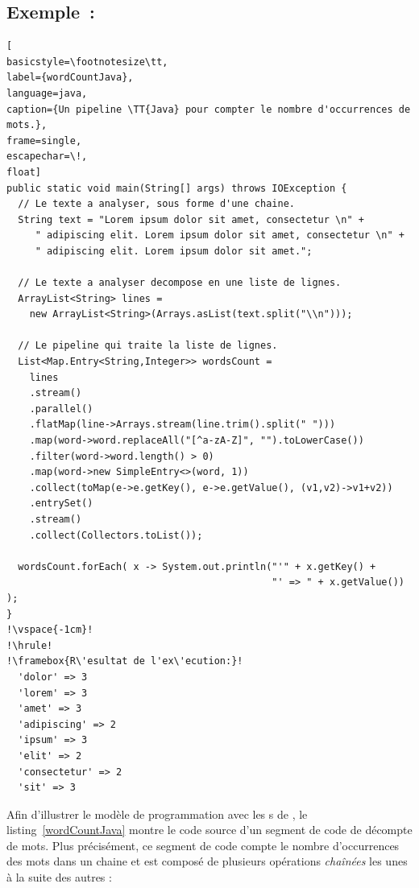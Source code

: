 \subsection{Exemple~: }


\begin{lstlisting}[
basicstyle=\footnotesize\tt,
label={wordCountJava},
language=java,
caption={Un pipeline \TT{Java} pour compter le nombre d'occurrences de mots.},
frame=single,
escapechar=\!,
float]
public static void main(String[] args) throws IOException {
  // Le texte a analyser, sous forme d'une chaine.
  String text = "Lorem ipsum dolor sit amet, consectetur \n" +
     " adipiscing elit. Lorem ipsum dolor sit amet, consectetur \n" +
     " adipiscing elit. Lorem ipsum dolor sit amet.";

  // Le texte a analyser decompose en une liste de lignes.
  ArrayList<String> lines = 
	new ArrayList<String>(Arrays.asList(text.split("\\n")));

  // Le pipeline qui traite la liste de lignes.	
  List<Map.Entry<String,Integer>> wordsCount = 
    lines
    .stream()
    .parallel()
    .flatMap(line->Arrays.stream(line.trim().split(" ")))
    .map(word->word.replaceAll("[^a-zA-Z]", "").toLowerCase())
    .filter(word->word.length() > 0)
    .map(word->new SimpleEntry<>(word, 1))
    .collect(toMap(e->e.getKey(), e->e.getValue(), (v1,v2)->v1+v2))
    .entrySet()
    .stream()
    .collect(Collectors.toList());   	
  
  wordsCount.forEach( x -> System.out.println("'" + x.getKey() + 
                                              "' => " + x.getValue()) );
}
!\vspace{-1cm}!
!\hrule!
!\framebox{R\'esultat de l'ex\'ecution:}!
  'dolor' => 3
  'lorem' => 3
  'amet' => 3
  'adipiscing' => 2
  'ipsum' => 3
  'elit' => 2
  'consectetur' => 2
  'sit' => 3
\end{lstlisting}


Afin d'illustrer le mod\`ele de programmation avec les s de , le listing~\ref{wordCountJava} montre le code source d'un segment de code  de d\'ecompte de mots. Plus pr\'ecis\'ement, ce segment de code compte le nombre d'occurrences des mots dans un chaine et est compos\'e de plusieurs op\'erations \emph{cha\^in\'ees} les unes \`a la suite des autres :

